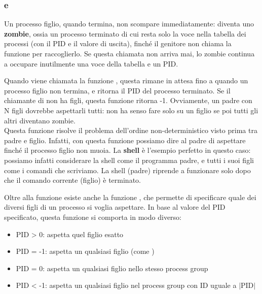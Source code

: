 \documentclass[11pt, a4paper, titlepage, oneside]{scrbook}
\begin{document}
\subsubsection*{ e }

\begin{Definizione}[Zombie]
\label{def-zombie}
Un processo figlio, quando termina, non scompare immediatamente: diventa uno \textbf{zombie}, ossia un processo terminato di cui resta solo la voce nella tabella dei processi (con il PID e il valore di uscita), finché il genitore non chiama la funzione  per raccoglierlo. Se questa chiamata non arriva mai, lo zombie continua a occupare inutilmente una voce della tabella e un PID. 
\end{Definizione}

Quando viene chiamata la funzione , questa rimane in attesa fino a quando un processo figlio non termina, e ritorna il PID del processo terminato. Se il chiamante di  non ha figli, questa funzione ritorna -1. Ovviamente, un padre con N figli dovrebbe aspettarli tutti: non ha senso fare  solo su un figlio se poi tutti gli altri diventano zombie. \\
Questa funzione risolve il problema dell'ordine non-deterministico visto prima tra padre e figlio. Infatti, con questa funzione possiamo dire al padre di aspettare finché il processo figlio non muoia. La \textbf{shell} è l'esempio perfetto in questo caso: possiamo infatti considerare la shell come il programma padre, e tutti i suoi figli come i comandi che scriviamo. La shell (padre) riprende a funzionare solo dopo che il comando corrente (figlio) è terminato.

Oltre alla funzione  esiste anche la funzione , che permette di specificare quale dei diversi figli di un processo si voglia aspettare. In base al valore del PID specificato, questa funzione si comporta in modo diverso:
\begin{itemize}
    \item PID > 0: aspetta quel figlio esatto
    \item PID = -1: aspetta un qualsiasi figlio (come )
    \item PID = 0: aspetta un qualsiasi figlio nello stesso process group
    \item PID < -1: aspetta un qualsiasi figlio nel process group con ID uguale a $|\text{PID}|$
\end{itemize}
\end{document}
